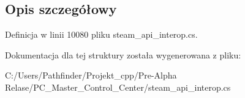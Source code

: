 \subsection{Opis szczegółowy}


Definicja w linii 10080 pliku steam\+\_\+api\+\_\+interop.\+cs.



Dokumentacja dla tej struktury została wygenerowana z pliku\+:\begin{DoxyCompactItemize}
\item 
C\+:/\+Users/\+Pathfinder/\+Projekt\+\_\+cpp/\+Pre-\/\+Alpha Relase/\+P\+C\+\_\+\+Master\+\_\+\+Control\+\_\+\+Center/steam\+\_\+api\+\_\+interop.\+cs\end{DoxyCompactItemize}
